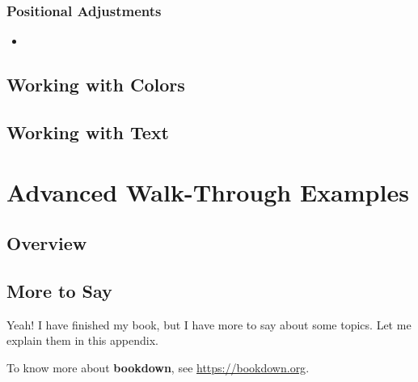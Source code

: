 \documentclass[
]{krantz}
\providecommand{\tightlist}{%
  \setlength{\itemsep}{0pt}\setlength{\parskip}{0pt}}
\begin{document}
\hypertarget{positional-adjustments}{%
\section{Positional Adjustments}\label{positional-adjustments}}

\begin{itemize}
\tightlist
\item
\end{itemize}

\hypertarget{working-with-colors}{%
\chapter{Working with Colors}\label{working-with-colors}}

\hypertarget{working-with-text}{%
\chapter{Working with Text}\label{working-with-text}}

\hypertarget{part-advanced-walk-through-examples}{%
\part{Advanced Walk-Through Examples}\label{part-advanced-walk-through-examples}}

\hypertarget{advanced-examples}{%
\chapter{Overview}\label{advanced-examples}}

\cleardoublepage

\hypertarget{appendix-appendix}{%
\appendix {}}


\hypertarget{more-to-say}{%
\chapter{More to Say}\label{more-to-say}}

Yeah! I have finished my book, but I have more to say about some topics. Let me explain them in this appendix.

To know more about \textbf{bookdown}, see \url{https://bookdown.org}.

  

\backmatter
\printindex
\end{document}
